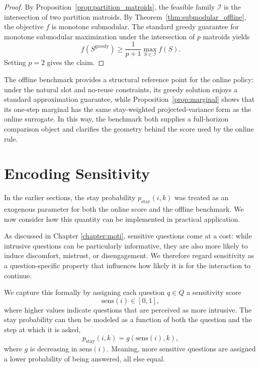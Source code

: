 \documentclass{article}
\begin{document}
\begin{proof}
By Proposition~\ref{prop:partition_matroids}, the feasible family $\mathcal I$ is the
intersection of two partition matroids. By Theorem~\ref{thm:submodular_offline},
the objective $f$ is monotone submodular. The standard greedy guarantee for monotone
submodular maximization under the intersection of $p$ matroids yields
\[
f(S^{\text{greedy}})
\ge
\frac{1}{p+1}\max_{S\in\mathcal I} f(S).
\]
Setting $p=2$ gives the claim.
\end{proof}

The offline benchmark provides a structural reference point for the online policy: under the natural slot and no-reuse constraints, its greedy solution enjoys a standard approximation guarantee, while Proposition~\ref{prop:marginal} shows that its one-step marginal has the same stay-weighted projected-variance form as the online surrogate. In this way, the benchmark both supplies a full-horizon comparison object and clarifies the geometry behind the score used by the online rule.

\section{Encoding Sensitivity}\label{sec:dropout}
In the earlier sections, the stay probability
$
p_{\mathrm{stay}}(i,k)
$
was treated as an exogenous parameter for both the online score and the offline benchmark. We now consider how this quantity can be implemented in practical application.

As discussed in Chapter \ref{chapter:moti}, sensitive questions come at a cost: 
while intrusive questions can be particularly informative, they are also more likely 
to
induce discomfort, mistrust, or disengagement. We therefore regard sensitivity as a question-specific property that influences how likely it is for the interaction to continue.

We capture this formally by assigning each question $q \in Q$ a sensitivity score
\begin{equation*}
 \text{sens}(i) \in \left[0,1\right],
\end{equation*}
where higher values indicate questions that are perceived as more intrusive. The stay probability can then be modeled as a function of both the
question and the step at which it is asked,
\[
p_{\mathrm{stay}}(i,k) = g(\text{sens}(i),k),
\]
where $g$ is decreasing in $\text{sens}(i)$. Meaning, more sensitive questions are assigned a lower
probability of being answered, all else equal.
\end{document}
